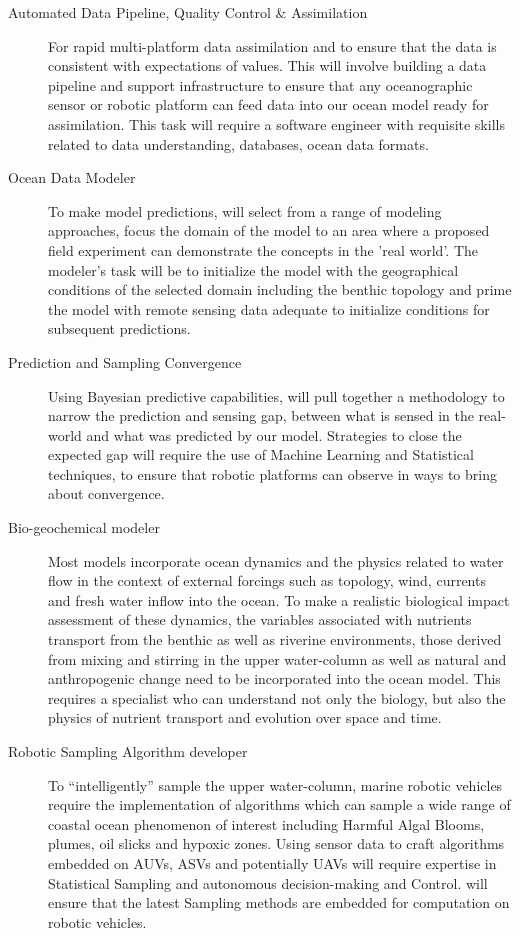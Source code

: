 \begin{description}

\item[Automated Data Pipeline, Quality Control \& Assimilation] For
  rapid multi-platform data assimilation and to ensure that the data is
  consistent with expectations of values. This will involve building a
  data pipeline and support infrastructure to ensure that any
  oceanographic sensor or robotic platform can feed data into our ocean
  model ready for assimilation. This task will require a software
  engineer with requisite skills related to data understanding,
  databases, ocean data formats.

\item[Ocean Data Modeler] To make model predictions, \pro will select
  from a range of modeling approaches, focus the domain of the model to
  an area where a proposed field experiment can demonstrate the concepts
  in the 'real world'. The modeler's task will be to initialize the
  model with the geographical conditions of the selected domain
  including the benthic topology and prime the model with remote sensing
  data adequate to initialize conditions for subsequent predictions.

\item[Prediction and Sampling Convergence] Using Bayesian predictive
  capabilities, \pro will pull together a methodology to narrow the
  prediction and sensing gap, between what is sensed in the real-world
  and what was predicted by our model. Strategies to close the expected
  gap will require the use of Machine Learning and Statistical
  techniques, to ensure that robotic platforms can observe in ways to
  bring about convergence. 

\item[Bio-geochemical modeler] Most models incorporate ocean dynamics
  and the physics related to water flow in the context of external
  forcings such as topology, wind, currents and fresh water inflow into
  the ocean. To make a realistic biological impact assessment of these
  dynamics, the variables associated with nutrients transport from the
  benthic as well as riverine environments, those derived from mixing
  and stirring in the upper water-column as well as natural and
  anthropogenic change need to be incorporated into the ocean
  model. This requires a specialist who can understand not only the
  biology, but also the physics of nutrient transport and evolution over
  space and time.

\item[Robotic Sampling Algorithm developer] To ``intelligently'' sample
  the upper water-column, marine robotic vehicles require the
  implementation of algorithms which can sample a wide range of coastal
  ocean phenomenon of interest including Harmful Algal Blooms, plumes,
  oil slicks and hypoxic zones. Using sensor data to craft algorithms
  embedded on AUVs, ASVs and potentially UAVs will require expertise in
  Statistical Sampling and autonomous decision-making and Control. \pro
  will ensure that the latest Sampling methods are embedded for
  computation on robotic vehicles.

\end{description}


